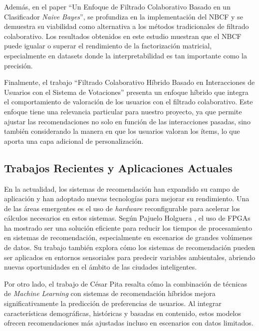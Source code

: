 \documentclass[runningheads,a4paper]{llncs}
\begin{document}
Además, en el paper ``Un Enfoque de Filtrado Colaborativo
Basado en un Clasificador \textit{Naive Bayes}''\cite{nbcf}, 
se profundiza en la implementación del NBCF y se demuestra su viabilidad como alternativa a los métodos tradicionales de filtrado colaborativo. Los resultados obtenidos en este estudio muestran que el NBCF puede igualar o superar el rendimiento de la factorización matricial, especialmente en datasets donde la interpretabilidad es tan importante como la precisión.

Finalmente, el trabajo ``Filtrado Colaborativo Híbrido Basado en Interacciones de Usuarios con el Sistema de Votaciones''\cite{hybrid_collaborative_filtering} presenta un enfoque híbrido que integra el comportamiento de valoración de los usuarios con el filtrado colaborativo. Este enfoque tiene una relevancia particular para 
nuestro proyecto, ya que permite ajustar las recomendaciones no solo en función de las interacciones pasadas, sino también considerando la manera en que los usuarios valoran los ítems, lo que aporta una capa adicional de personalización.

\subsection{Trabajos Recientes y Aplicaciones Actuales}

En la actualidad, los sistemas de recomendación han 
expandido su campo de aplicación y han adoptado nuevas 
tecnologías para mejorar su rendimiento. Una de las 
áreas emergentes es el uso de \textit{hardware} reconfigurable 
para acelerar los cálculos necesarios en estos 
sistemas. Según Pajuelo Holguera \cite{TDUEX_2021_Pajuelo_Holguera}, 
el uso de FPGAs ha mostrado ser una solución eficiente 
para reducir los tiempos de procesamiento en sistemas 
de recomendación, especialmente en escenarios de 
grandes volúmenes de datos. Su trabajo también explora 
cómo los sistemas de recomendación pueden ser 
aplicados en entornos sensoriales para predecir 
variables ambientales, abriendo nuevas oportunidades 
en el ámbito de las ciudades inteligentes.

Por otro lado, el trabajo de César 
Pita \cite{_Cesar_Enrique_Pita_Perez} resalta cómo 
la combinación de técnicas de \textit{Machine Learning} 
con sistemas de recomendación híbridos mejora 
significativamente la predicción de preferencias de 
usuarios. Al integrar características demográficas, 
históricas y basadas en contenido, estos modelos 
ofrecen recomendaciones más ajustadas incluso en 
escenarios con datos limitados.
\end{document}
